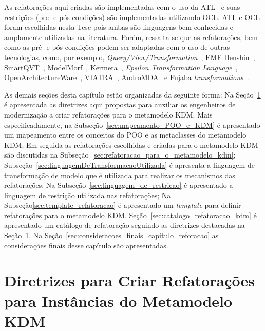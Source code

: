 
As refatorações aqui criadas são implementadas com o uso da ATL~\cite{Allilaire_06, Jouault_2005, Jouault_2008} e suas restrições (pre- e pós-condições) são implementadas utilizando OCL. ATL e OCL foram escolhidas nesta Tese pois ambas são linguagens bem conhecidas e amplamente utilizadas na literatura. Porém, ressalta-se que as refatorações, bem como as pré- e pós-condições podem ser adaptadas com o uso de outras tecnologias, como, por exemplo, \textit{Query/View/Transformation}~\cite{QVT:OMG}, EMF Henshin~\cite{EMF_Henshin}, SmartQVT~\cite{SmartQVT}, ModelMorf~\cite{ModelMorf}, Kermeta~\cite{kermeta}, \textit{Epsilon Transformation Language}~\cite{ETL_eclipse}, OpenArchitectureWare~\cite{OpenArchitectureWare}, VIATRA~\cite{viatra}, AndroMDA~\cite{andromda} e Fujaba \textit{transformations}~\cite{fujaba}.

As demais seções desta capítulo estão organizadas da seguinte forma: Na Seção~\ref{sec:estrategiasParaAdaptarRefatoracoesParaOMetamodeloKDM} é apresentada as diretrizes aqui propostas para auxiliar os engenheiros de modernização a criar refatorações para o metamodelo KDM. Mais especificadamente, na Subseção~\ref{sec:mapeamento_POO_e_KDM} é apresentado um mapeamento entre os conceitos do POO e as metaclasses do metamodelo KDM; Em seguida as refatorações escolhidas e criadas para o metamodelo KDM são discutidas na Subseção~\ref{sec:refatoracao_para_o_metamodelo_kdm}; Subseção~\ref{sec:linguagemDeTransformacaoUtilizada} é apresenta a linguagem de transformação de modelo que é utilizada para realizar os mecanismos das refatorações; Na Subseção~\ref{sec:linguagem_de_restricao} é apresentado a linguagem de restrição utilizada nas refatorações; Na Subseção\ref{sec:template_refatoracao} é apresentado um \textit{template} para definir refatorações para o metamodelo KDM. Seção~\ref{sec:catalogo_refatoracao_kdm} é apresentado um catálogo de refatoração seguindo as diretrizes destacadas na Seção~\ref{sec:estrategiasParaAdaptarRefatoracoesParaOMetamodeloKDM}. Na Seção~\ref{sec:consideracoes_finais_capitulo_reforacao} as considerações finais desse capítulo são apresentadas.


\section{Diretrizes para Criar Refatorações para Instâncias do Metamodelo KDM}\label{sec:estrategiasParaAdaptarRefatoracoesParaOMetamodeloKDM}

